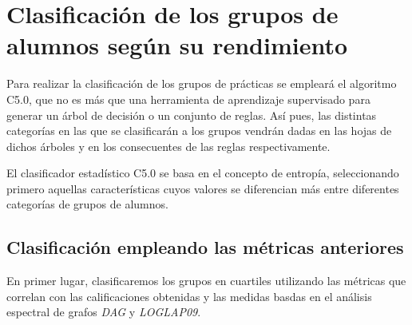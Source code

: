\chapter{Clasificación de los grupos de alumnos según su rendimiento}

Para realizar la clasificación de los grupos de prácticas se empleará el algoritmo C5.0, que no es más que una herramienta de aprendizaje supervisado para generar un árbol de decisión o un conjunto de reglas. Así pues, las distintas categorías en las que se clasificarán a los grupos vendrán dadas en las hojas de dichos árboles y en los consecuentes de las reglas respectivamente.

El clasificador estadístico C5.0 se basa en el concepto de entropía, seleccionando primero aquellas características cuyos valores se diferencian más entre diferentes categorías de grupos de alumnos.

\section{Clasificación empleando las métricas anteriores}

En primer lugar, clasificaremos los grupos en cuartiles utilizando las métricas que correlan con las calificaciones obtenidas y las medidas basdas en el análisis espectral de grafos \emph{DAG} y \emph{LOGLAP09}.